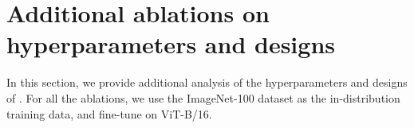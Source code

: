 \begin{table}[h]
    \centering
    \caption{Calibration performance (numbers are in \%).}
      \label{tab:calibration}\vspace{-1em}
  \end{table}






\section{Additional ablations on hyperparameters and designs}
\label{sec:abaltion_app}
In this section, we provide additional analysis of the hyperparameters and designs of \model. For all the ablations, we use the ImageNet-100 dataset as the in-distribution training data, and fine-tune on ViT-B/16.




\vspace{-0.2cm}
